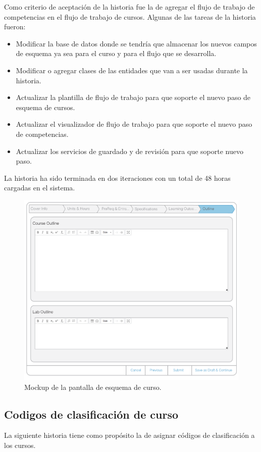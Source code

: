 Como criterio de aceptación de la historia fue la de agregar el flujo de trabajo de competencias en el flujo de trabajo de cursos. Algunas de las tareas de la historia fueron:
\begin{itemize}
	\item Modificar la base de datos donde se tendría que almacenar los nuevos campos de esquema ya sea para el curso y para el flujo que se desarrolla.
	\item Modificar o agregar clases de las entidades que van a ser usadas durante la historia.
	\item Actualizar la plantilla de flujo de trabajo para que soporte el nuevo paso de esquema de cursos.
	\item Actualizar el visualizador de flujo de trabajo para que soporte el nuevo paso de competencias.
	\item Actualizar los servicios de guardado y de revisión para que soporte nuevo paso.
\end{itemize}

La historia ha sido terminada en dos iteraciones con un total de 48 horas cargadas en el sistema.

\begin{figure}[H]
\centering
\includegraphics[scale=0.3]{Capitulos/DesarrollodelaAplicacion/Imagenes/course_outline}
\caption{Mockup de la pantalla de esquema de curso.}
  \label{course_outline}
\end{figure}

\subsection{Codigos de clasificación de curso}
La siguiente historia tiene como propósito la de asignar códigos de clasificación a los cursos.

